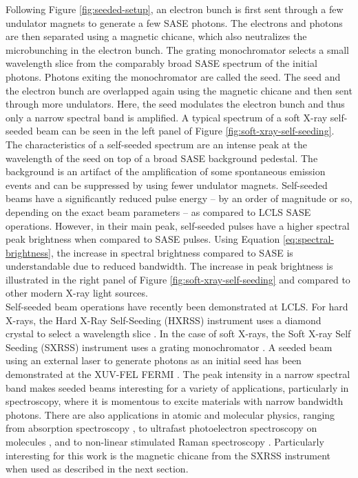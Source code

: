 Following Figure \ref{fig:seeded-setup}, an electron bunch is first sent through a few undulator magnets to generate a few SASE photons. The electrons and photons are then separated using a magnetic chicane, which also neutralizes the microbunching in the electron bunch. The grating monochromator selects a small wavelength slice from the comparably broad SASE spectrum of the initial photons. Photons exiting the monochromator are called the seed. The seed and the electron bunch are overlapped again using the magnetic chicane and then sent through more undulators. Here, the seed modulates the electron bunch and thus only a narrow spectral band is amplified. A typical spectrum of a soft X-ray self-seeded beam can be seen in the left panel of Figure \ref{fig:soft-xray-self-seeding}. The characteristics of a self-seeded spectrum are an intense peak at the wavelength of the seed on top of a broad SASE background pedestal. The background is an artifact of the amplification of some spontaneous emission events and can be suppressed by using fewer undulator magnets. Self-seeded beams have a significantly reduced pulse energy -- by an order of magnitude or so, depending on the exact beam parameters -- as compared to LCLS SASE operations. However, in their main peak, self-seeded pulses have a higher spectral peak brightness when compared to SASE pulses. Using Equation \eqref{eq:spectral-brightness}, the increase in spectral brightness compared to SASE is understandable due to reduced bandwidth. The increase in peak brightness is illustrated in the right panel of Figure \ref{fig:soft-xray-self-seeding} and compared to other modern X-ray light sources.\\[1\baselineskip]
%
Self-seeded beam operations have recently been demonstrated at LCLS. For hard X-rays, the Hard X-Ray Self-Seeding (HXRSS) instrument uses a diamond crystal to select a wavelength slice \citep{Amann-2012-NatPho}. In the case of soft X-rays, the Soft X-ray Self Seeding (SXRSS) instrument uses a grating monochromator \citep{Ratner-2015-PRL}. A seeded beam using an external laser to generate photons as an initial seed has been demonstrated at the XUV-FEL FERMI \citep{Allaria-2012-NatPho}. The peak intensity in a narrow spectral band makes seeded beams interesting for a variety of applications, particularly in spectroscopy, where it is momentous to excite materials with narrow bandwidth photons. There are also applications in atomic and molecular physics, ranging from absorption spectroscopy \citep{Ferguson-2014-Unpublished}, to ultrafast photoelectron spectroscopy on molecules \citep{Bucher-2014-Unpublished}, and to non-linear stimulated Raman spectroscopy \citep{Kimberg-2016-FD}. Particularly interesting for this work is the magnetic chicane from the SXRSS instrument when used as described in the next section.
%
%
%
%
